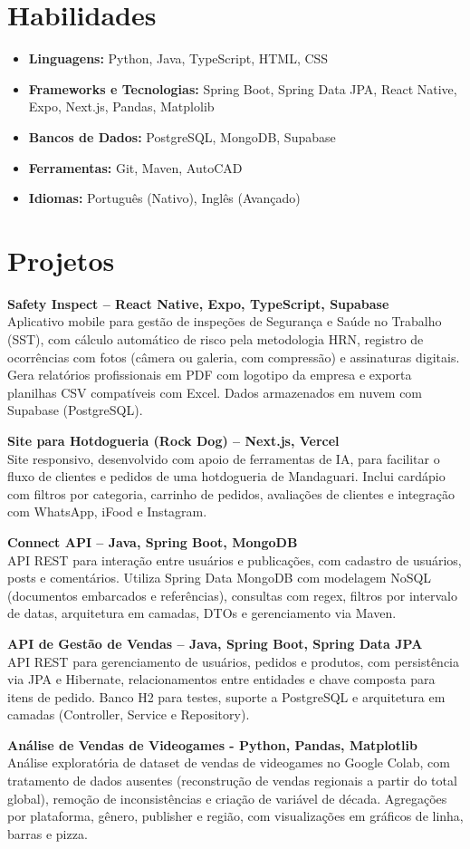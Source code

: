 \documentclass[a4paper,10pt]{article}
\begin{document}
\section{Habilidades}
    \begin{itemize}
        \item \textbf{Linguagens:} Python, Java, TypeScript, HTML, CSS
        \item \textbf{Frameworks e Tecnologias:} Spring Boot, Spring Data JPA, React Native, Expo, Next.js, Pandas, Matplolib
        \item \textbf{Bancos de Dados:} PostgreSQL, MongoDB, Supabase
        \item \textbf{Ferramentas:} Git, Maven, AutoCAD
        \item \textbf{Idiomas:} Português (Nativo), Inglês (Avançado)
    \end{itemize}

\section{Projetos}
\textbf{Safety Inspect – React Native, Expo, TypeScript, Supabase} \\
Aplicativo mobile para gestão de inspeções de Segurança e Saúde no Trabalho (SST), com cálculo automático de risco pela metodologia HRN, registro de ocorrências com fotos (câmera ou galeria, com compressão) e assinaturas digitais. Gera relatórios profissionais em PDF com logotipo da empresa e exporta planilhas CSV compatíveis com Excel. Dados armazenados em nuvem com Supabase (PostgreSQL).

\textbf{Site para Hotdogueria (Rock Dog) – Next.js, Vercel} \\
Site responsivo, desenvolvido com apoio de ferramentas de IA, para facilitar o fluxo de clientes e pedidos de uma hotdogueria de Mandaguari. Inclui cardápio com filtros por categoria, carrinho de pedidos, avaliações de clientes e integração com WhatsApp, iFood e Instagram.

\textbf{Connect API – Java, Spring Boot, MongoDB} \\
API REST para interação entre usuários e publicações, com cadastro de usuários, posts e comentários. Utiliza Spring Data MongoDB com modelagem NoSQL (documentos embarcados e referências), consultas com regex, filtros por intervalo de datas, arquitetura em camadas, DTOs e gerenciamento via Maven.

\textbf{API de Gestão de Vendas – Java, Spring Boot, Spring Data JPA} \\
API REST para gerenciamento de usuários, pedidos e produtos, com persistência via JPA e Hibernate, relacionamentos entre entidades e chave composta para itens de pedido. Banco H2 para testes, suporte a PostgreSQL e arquitetura em camadas (Controller, Service e Repository).

\textbf{Análise de Vendas de Videogames - Python, Pandas, Matplotlib} \\
Análise exploratória de dataset de vendas de videogames no Google Colab, com tratamento de dados ausentes (reconstrução de vendas regionais a partir do total global), remoção de inconsistências e criação de variável de década. Agregações por plataforma, gênero, publisher e região, com visualizações em gráficos de linha, barras e pizza.
\end{document}
